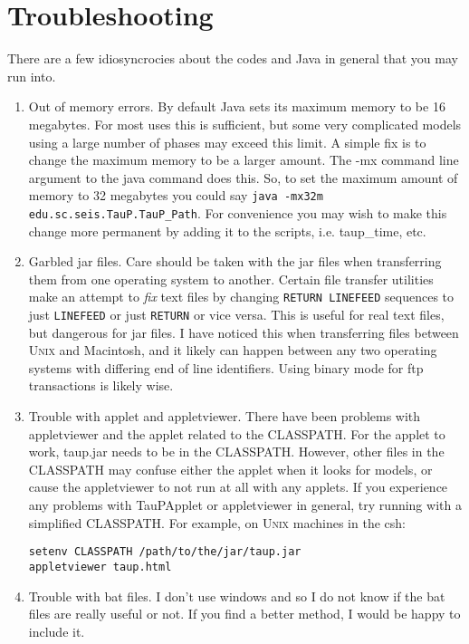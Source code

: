  
\section{Troubleshooting}

There are a few idiosyncrocies about the codes and Java in general that you may
run into.

\begin{enumerate}

\item Out of memory errors. By default Java sets its maximum memory to be
16 megabytes. For most uses this is sufficient, but some very complicated
models using a large number of phases may exceed this limit. A simple fix is
to change the maximum memory to be a larger amount. The -mx command line argument
to the java command does this. So, to set the maximum amount of memory to
32 megabytes you could say \texttt{java -mx32m edu.sc.seis.TauP.TauP\_Path}.
For convenience you may wish to make this change more permanent by adding it
to the scripts, i.e. taup\_time, etc.

\item Garbled jar files. Care should be taken with the jar files when 
transferring them
from one operating system to another. Certain file transfer utilities 
make an attempt
to \textit{fix} text files by changing \texttt{RETURN LINEFEED} sequences to
just \texttt{LINEFEED} or just \texttt{RETURN} or vice versa. This is useful for
real text files, but dangerous for jar files. I have noticed this when 
transferring
files between \textsc{Unix} and Macintosh, and it likely can happen 
between any two
operating systems with differing end of line identifiers. Using binary mode for
ftp transactions is likely wise.

\item Trouble with applet and appletviewer. There have been problems with 
appletviewer
and the applet related to the CLASSPATH. For the applet to work, 
taup.jar needs to
be in the CLASSPATH. However, other files in the CLASSPATH may confuse either
the applet when it looks for models, or cause the appletviewer to not run at all
with any applets. If you experience any problems with TauPApplet or 
appletviewer in
general, try running with a simplified CLASSPATH.  For example, on
\textsc{Unix} machines in the csh:
\begin{verbatim}
setenv CLASSPATH /path/to/the/jar/taup.jar
appletviewer taup.html
\end{verbatim}

\item Trouble with bat files. I don't use windows and so I do not know if the
bat files are really useful or not. If you find a better method, I would be 
happy to include it.
\end{enumerate}

